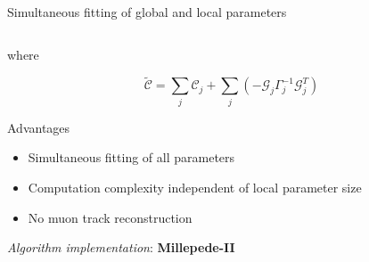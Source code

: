 \documentclass[compress, 13pt, aspectratio=169]{beamer}
\begin{document}
\begin{frame}[t,fragile]{Simultaneous fitting of global and local parameters}
\begin{columns}[t]
\begin{column}[t]{0.45\textwidth}
{				where
				\vspace*{-1em}

				$$\tilde{\mathcal{C}} = \sum_j \mathcal{C}_j + \sum_j \left(-\mathcal{G}_j \Gamma^{-1}_j \mathcal{G}^T_j \right)$$
			}
			\vspace*{-1em}

			\pause
			\begin{exampleblock} {Advantages}
				\small
				\begin{itemize}
					\item Simultaneous fitting of all parameters
					\item Computation complexity independent of local parameter size
					\item No muon track reconstruction
				\end{itemize}
			\end{exampleblock}
			\pause
			\textit{\small Algorithm implementation}: \large{\textbf{Millepede-II}}
		\end{column}
	\end{columns}

\end{frame}
\end{document}
